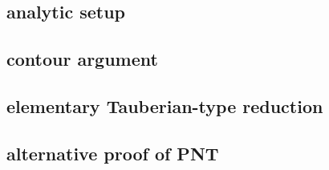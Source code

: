 

\subsection{analytic setup}
\label{b3:subsec:270601}

\subsection{contour argument}
\label{b3:subsec:270602}

\subsection{elementary Tauberian-type reduction}
\label{b3:subsec:270603}

\subsection{alternative proof of PNT}
\label{b3:subsec:270604}


